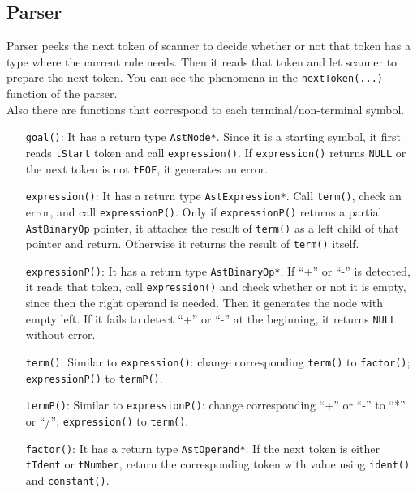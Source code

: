 \documentclass[11pt]{article}
\begin{document}
\subsection{Parser} \label{ssec:2.3}

Parser peeks the next token of scanner to decide whether or not that token has a type where the current rule needs. Then it reads that token and let scanner to prepare the next token. You can see the phenomena in the \texttt{nextToken(...)} function of the parser. \\
Also there are functions that correspond to each terminal/non-terminal symbol.
\begin{itemize}
	\item [\texttt{goal()}:] It has a return type \texttt{AstNode*}. Since it is a starting symbol, it first reads \texttt{tStart} token and call \texttt{expression()}. If \texttt{expression()} returns \texttt{NULL} or the next token is not \texttt{tEOF}, it generates an error.
	\item [\texttt{expression()}:] It has a return type \texttt{AstExpression*}. Call \texttt{term()}, check an error, and call \texttt{expressionP()}. Only if \texttt{expressionP()} returns a partial \texttt{AstBinaryOp} pointer, it attaches the result of \texttt{term()} as a left child of that pointer and return. Otherwise it returns the result of \texttt{term()} itself.
	\item [\texttt{expressionP()}:] It has a return type \texttt{AstBinaryOp*}. If ``+'' or ``-'' is detected, it reads that token, call \texttt{expression()} and check whether or not it is empty, since then the right operand is needed. Then it generates the node with empty left. If it fails to detect ``+'' or ``-'' at the beginning, it returns \texttt{NULL} without error.
	\item [\texttt{term()}:] Similar to \texttt{expression()}: change corresponding \texttt{term()} to \texttt{factor()}; \texttt{expressionP()} to \texttt{termP()}.
	\item [\texttt{termP()}:] Similar to \texttt{expressionP()}: change corresponding ``+'' or ``-'' to ``*'' or ``/''; \texttt{expression()} to \texttt{term()}.
	\item [\texttt{factor()}:] It has a return type \texttt{AstOperand*}. If the next token is either \texttt{tIdent} or \texttt{tNumber}, return the corresponding token with value using \texttt{ident()} and \texttt{constant()}.
\end{itemize}
\end{document}
